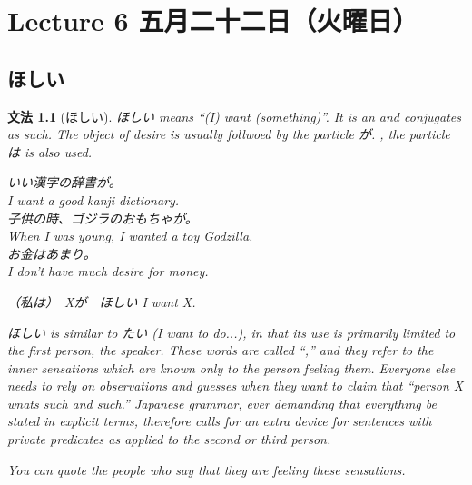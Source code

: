 \documentclass[notoc,notitlepage]{tufte-book}
\newtheorem{grammar}{\faBook \enspace 文法}[section]
\begin{document}

\chapter{Lecture 6 五月二十二日（火曜日）}%
\label{chp:lecture_6_wu_yue_er_shi_er_ri_huo_yao_ri_}

\section{ほしい}
\label{sec:hoshii}

\begin{grammar}[ほしい]
\label{grammar:hoshii}
  ほしい means ``(I) want (something)''. It is an  and conjugates as such. The object of desire is usually follwoed by the particle が. , the particle は is also used.

  いい漢字の辞書が。\\
  I want a good kanji dictionary. \\
  子供の時、ゴジラのおもちゃが。\\
  When I was young, I wanted a toy Godzilla. \\
  お金はあまり。\\
  I don't have much desire for money.

  \begin{center}
    （私は）　Xが　ほしい \qquad I want X.
  \end{center}

  \noindent ほしい is similar to たい (I want to do...), in that its use is primarily limited to the first person, the speaker. These words are called ``,'' and they refer to the inner sensations which are known only to the person feeling them. Everyone else needs to rely on observations and guesses when they want to claim that ``person X wnats such and such.'' Japanese grammar, ever demanding that everything be stated in explicit terms, therefore calls for an extra device for sentences with private predicates as applied to the second or third person.

  \noindent You can quote the people who say that they are feeling these sensations.


\end{grammar}
\end{document}
